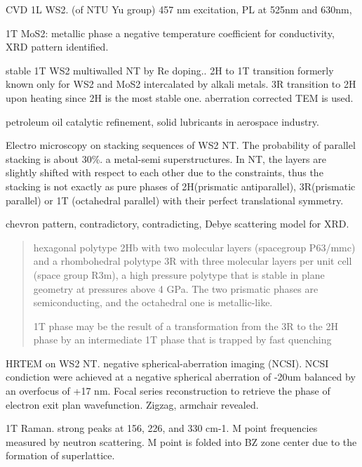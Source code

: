CVD 1L WS2.\cite{Cong2013} (of NTU Yu group) 457 nm excitation, PL at 525nm and 630nm, 

\cite{Xiao2014}

1T MoS2: metallic phase a negative temperature coefficient for conductivity, XRD pattern identified. \cite{Wypych1992}

stable 1T WS2 multiwalled NT by Re doping.\cite{Enyashin2011}. 2H to 1T transition formerly known only for WS2 and MoS2 intercalated by alkali metals. 3R transition to 2H upon heating since 2H is the most stable one.
aberration corrected TEM is used.

petroleum oil catalytic refinement, solid lubricants in aerospace industry.

Electro microscopy on stacking sequences of WS2 NT.\cite{Houben2012} The probability of parallel stacking is about 30\%. a metal-semi superstructures. In NT, the layers are slightly shifted with respect to each other due to the constraints, thus the stacking is not exactly as pure phases of 2H(prismatic antiparallel), 3R(prismatic parallel) or 1T (octahedral parallel) with their perfect translational symmetry.

chevron pattern, contradictory, contradicting, Debye scattering model for XRD.

\begin{quote}
hexagonal polytype 2Hb with two molecular layers (spacegroup P63/mmc) and a rhombohedral polytype 3R with three molecular layers per unit cell (space group R3m), a high pressure polytype that is stable in plane geometry at pressures above 4 GPa. The two prismatic phases are semiconducting, and the octahedral one is metallic-like.

1T phase may be the result of a transformation from the 3R to the 2H phase by an intermediate 1T phase that is trapped by fast quenching

\end{quote}


HRTEM on WS2 NT.\cite{Sadan2008} negative spherical-aberration imaging (NCSI). NCSI condiction were achieved at a negative spherical aberration of -20um balanced by an overfocus of +17 nm. Focal series reconstruction to retrieve the phase of electron exit plan wavefunction. Zigzag, armchair revealed.

1T  Raman. \cite{Yang1991} strong peaks at 156, 226, and 330 cm-1. M point frequencies measured by neutron scattering. M point is folded into BZ zone center due to the formation of superlattice.

